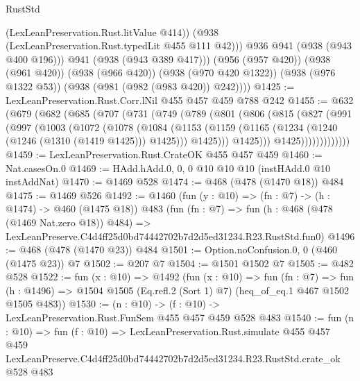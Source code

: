 \begin{lexlean}{RustStd}
\begin{coremodule}
                (LexLeanPreservation.Rust.litValue @414))
              (@938 (LexLeanPreservation.Rust.typedLit @455 @111 @42)))
            @936
            @941
            (@938 (@943 @400 @196)))
          @941
          (@938 (@943 @389 @417)))
        (@956 (@957 @420))
        (@938 (@961 @420))
        (@938 (@966 @420))
        (@938 (@970 @420 @1322))
        (@938 (@976 @1322 @53))
        (@938 (@981 (@982 (@983 @420)) @242))))
@1425 := LexLeanPreservation.Rust.Corr.lNil @455 @457 @459 @788 @242
@1455 := @632
    (@679
      (@682
        (@685
          (@707
            (@731
              (@749
                (@789
                  (@801
                    (@806
                      (@815
                        (@827
                          (@991
                            (@997
                              (@1003
                                (@1072
                                  (@1078
                                    (@1084
                                      (@1153
                                        (@1159
                                          (@1165
                                            (@1234 (@1240 (@1246 (@1310 (@1419 @1425))) @1425)))
                                          @1425)))
                                    @1425)))
                              @1425)))))))))))))
@1459 := LexLeanPreservation.Rust.CrateOK @455 @457 @459
@1460 := Nat.casesOn.{0}
@1469 := HAdd.hAdd.{0, 0, 0} @10 @10 @10 (instHAdd.{0} @10 instAddNat)
@1470 := @1469 @528
@1474 := @468 (@478 (@1470 @18)) @484
@1475 := @1469 @526
@1492 := @1460
    (fun (y : @10) => (fn : @7) -> (h : @1474) -> @460 (@1475 @18))
    @483
    (fun (fn : @7) =>
    fun (h : @468 (@478 (@1469 Nat.zero @18)) @484) =>
    LexLeanPreserve.C4d4ff25d0bd74442702b7d2d5ed31234.R23.RustStd.fun0)
@1496 := @468 (@478 (@1470 @23)) @484
@1501 := Option.noConfusion.{0, 0} (@460 (@1475 @23)) @7
@1502 := @207 @7
@1504 := @1501 @1502 @7
@1505 := @482 @528
@1522 := fun (x : @10) =>
  @1492
    (fun (x : @10) =>
    fun (fn : @7) =>
    fun (h : @1496) => @1504 @1505 (Eq.refl.{2} (Sort 1) @7) (heq_of_eq.{1} @467 @1502 @1505 @483))
@1530 := (n : @10) -> (f : @10) -> LexLeanPreservation.Rust.FunSem @455 @457 @459 @528 @483
@1540 := fun (n : @10) =>
  fun (f : @10) =>
  LexLeanPreservation.Rust.simulate
    @455
    @457
    @459
    LexLeanPreserve.C4d4ff25d0bd74442702b7d2d5ed31234.R23.RustStd.crate_ok
    @528
    @483
\end{coremodule}
\end{lexlean}
